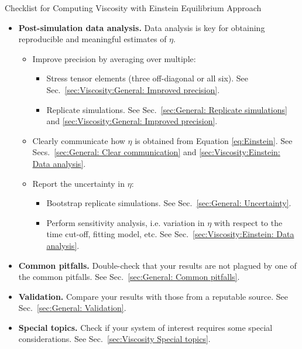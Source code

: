 \documentclass[9pt,bestpractices]{livecoms}
\begin{document}
\begin{Checklists*}[p!]
\begin{checklist}{Checklist for Computing Viscosity with Einstein Equilibrium Approach}
\begin{itemize}
			\item
			\textbf{Post-simulation data analysis.} Data analysis is key for obtaining reproducible and meaningful estimates of $\eta$.
			\begin{itemize}
				\item Improve precision by averaging over multiple:
				\begin{itemize}
					\item Stress tensor elements (three off-diagonal or all six). See Sec.\ \ref{sec:Viscosity:General: Improved precision}.
					\item Replicate simulations. See Sec.\ \ref{sec:General: Replicate simulations} and \ref{sec:Viscosity:General: Improved precision}.
				\end{itemize}
				\item Clearly communicate how $\eta$ is obtained from Equation \ref{eq:Einstein}. See Secs.\ \ref{sec:General: Clear communication} and \ref{sec:Viscosity:Einstein: Data analysis}.
				\item Report the uncertainty in $\eta$:
				\begin{itemize}
					\item Bootstrap replicate simulations. See Sec.\ \ref{sec:General: Uncertainty}.
					\item Perform sensitivity analysis, i.e. variation in $\eta$ with respect to the time cut-off, fitting model, etc. See Sec.\ \ref{sec:Viscosity:Einstein: Data analysis}.
				\end{itemize}
			\end{itemize}
			\vspace{-0.325\baselineskip} %

			\item
			\textbf{Common pitfalls.} Double-check that your results are not plagued by one of the common pitfalls. See Sec.\ \ref{sec:General: Common pitfalls}.

			\item
			\textbf{Validation.} Compare your results with those from a reputable source. See Sec.\ \ref{sec:General: Validation}.

			\item
			\textbf{Special topics.} Check if your system of interest requires some special considerations. See Sec.\ \ref{sec:Viscosity Special topics}.

		\end{itemize}
	\end{checklist}
\end{Checklists*}
\end{document}
